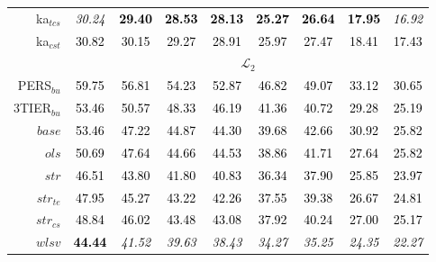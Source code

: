 \begin{tabular}[t]{r|cccccccc}
ka$_{tcs}$ & \textcolor{black}{\em{30.24}} & \textcolor{black}{\textbf{29.40}} & \textcolor{black}{\textbf{28.53}} & \textcolor{black}{\textbf{28.13}} & \textcolor{black}{\textbf{25.27}} & \textcolor{black}{\textbf{26.64}} & \textcolor{black}{\textbf{17.95}} & \textcolor{black}{\em{16.92}}\\
ka$_{cst}$ & \textcolor{black}{30.82} & \textcolor{black}{30.15} & \textcolor{black}{29.27} & \textcolor{black}{28.91} & \textcolor{black}{25.97} & \textcolor{black}{27.47} & \textcolor{black}{18.41} & \textcolor{black}{17.43}\\
\addlinespace[0.3em]
\multicolumn{1}{c}{} & \multicolumn{8}{c}{$\mathcal{L}_2$}\\
PERS$_{bu}$ & \textcolor{black}{59.75} & \textcolor{black}{56.81} & \textcolor{black}{54.23} & \textcolor{black}{52.87} & \textcolor{black}{46.82} & \textcolor{black}{49.07} & \textcolor{black}{33.12} & \textcolor{black}{30.65}\\
3TIER$_{bu}$ & \textcolor{black}{53.46} & \textcolor{black}{50.57} & \textcolor{black}{48.33} & \textcolor{black}{46.19} & \textcolor{black}{41.36} & \textcolor{black}{40.72} & \textcolor{black}{29.28} & \textcolor{black}{25.19}\\
$base$ & \textcolor{black}{53.46} & \textcolor{black}{47.22} & \textcolor{black}{44.87} & \textcolor{black}{44.30} & \textcolor{black}{39.68} & \textcolor{black}{42.66} & \textcolor{black}{30.92} & \textcolor{black}{25.82}\\
$ols$ & \textcolor{black}{50.69} & \textcolor{black}{47.64} & \textcolor{black}{44.66} & \textcolor{black}{44.53} & \textcolor{black}{38.86} & \textcolor{black}{41.71} & \textcolor{black}{27.64} & \textcolor{black}{25.82}\\
$str$ & \textcolor{black}{46.51} & \textcolor{black}{43.80} & \textcolor{black}{41.80} & \textcolor{black}{40.83} & \textcolor{black}{36.34} & \textcolor{black}{37.90} & \textcolor{black}{25.85} & \textcolor{black}{23.97}\\
$str_{te}$ & \textcolor{black}{47.95} & \textcolor{black}{45.27} & \textcolor{black}{43.22} & \textcolor{black}{42.26} & \textcolor{black}{37.55} & \textcolor{black}{39.38} & \textcolor{black}{26.67} & \textcolor{black}{24.81}\\
$str_{cs}$ & \textcolor{black}{48.84} & \textcolor{black}{46.02} & \textcolor{black}{43.48} & \textcolor{black}{43.08} & \textcolor{black}{37.92} & \textcolor{black}{40.24} & \textcolor{black}{27.00} & \textcolor{black}{25.17}\\
$wlsv$ & \textcolor{black}{\textbf{44.44}} & \textcolor{black}{\em{41.52}} & \textcolor{black}{\em{39.63}} & \textcolor{black}{\em{38.43}} & \textcolor{black}{\em{34.27}} & \textcolor{black}{\em{35.25}} & \textcolor{black}{\em{24.35}} & \textcolor{black}{\em{22.27}}\\

\end{tabular}
